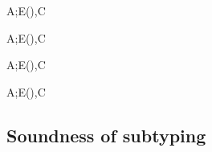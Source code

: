 \documentclass{amsart}
\theoremstyle{definition}
\begin{document}
{A;E\vdash(\All\alpha\sigma)\Sub\tau,C}

{A;E\vdash\sigma\Sub(\Ex\alpha\tau),C}

{A;E\vdash(\Ex\alpha\sigma)\Sub\tau,C}

{A;E\vdash\sigma\Sub(\All\alpha\tau),C}

\subsection{Soundness of subtyping}
\label{subsound}




\end{document}
